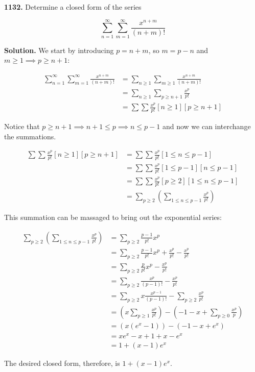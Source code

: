 \documentclass{letter}
\begin{document}
\newtheorem{lemma}{Lemma}

\begin{letter}{}
\textbf{1132.} Determine a closed form of the series

  $$ \sum_{n=1}^{\infty} \sum_{m=1}^{\infty}\frac{x^{n+m}}{(n+m)!}$$
    
  \textbf{Solution.} We start by introducing $p=n+m$, so $m=p-n$ and $m\ge 1\implies p\ge n+1$:

  \begin{align*}
    \sum_{n=1}^{\infty} \sum_{m=1}^{\infty}\frac{x^{n+m}}{(n+m)!}
    &= \sum_{n\ge 1} \sum_{m\ge 1}\frac{x^{n+m}}{(n+m)!} \\
    &= \sum_{n\ge 1} \sum_{p\ge n+1}\frac{x^p}{p!} \\
    &= \sum \sum \frac{x^p}{p!}[n\ge 1][p\ge n+1]
  \end{align*}

  Notice that $p\ge n+1\implies n+1\le p \implies n\le p-1$ and now we can interchange the summations.

  \begin{align*}
    \sum \sum \frac{x^p}{p!}[n\ge 1][p\ge n+1]
    &= \sum \sum \frac{x^p}{p!}[1\le n\le p-1] \\
    &= \sum \sum \frac{x^p}{p!}[1\le p-1][n\le p-1] \\
    &= \sum \sum \frac{x^p}{p!}[p\ge 2][1\le n\le p-1] \\
    &= \sum_{p\ge 2} \left(\sum_{1\le n\le p-1} \frac{x^p}{p!}\right)
  \end{align*} 

  This summation can be massaged to bring out the exponential series:

  \begin{align*}
    \sum_{p\ge 2}\left( \sum_{1\le n\le p-1} \frac{x^p}{p!} \right)
    &= \sum_{p\ge 2} \frac{p-1}{p!}x^p \\
    &= \sum_{p\ge 2} \frac{p-1}{p!}x^p + \frac{x^p}{p!} - \frac{x^p}{p!} \\
    &= \sum_{p\ge 2} \frac{p}{p!}x^p - \frac{x^p}{p!} \\
    &= \sum_{p\ge 2} \frac{x^p}{(p-1)!} - \frac{x^p}{p!} \\
    &= \sum_{p\ge 2} x\frac{x^{p-1}}{(p-1)!} -\sum_{p\ge 2} \frac{x^p}{p!} \\
    &= \left(x\sum_{p\ge 1} \frac{x^p}{p!}\right) 
       -\left( -1-x+\sum_{p\ge 0} \frac{x^p}{p} \right) \\
    &= \left(x \left(e^x-1\right)\right) 
       -\left( -1-x+e^x\right) \\
    &= xe^x -x +1 + x-e^x \\
    &= 1+(x-1)e^x
  \end{align*} 

  The desired closed form, therefore, is $1+(x-1)e^x$.

\end{letter}
\end{document}
